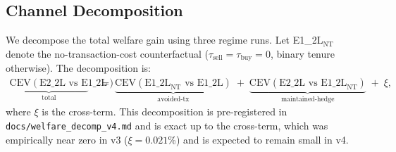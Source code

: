 \subsection{Channel Decomposition}
\label{sec:results:decomp}

We decompose the total welfare gain using three regime runs.
Let E1\_2L$_{\text{NT}}$ denote the no-transaction-cost counterfactual
($\tau_{\text{sell}} = \tau_{\text{buy}} = 0$, binary tenure otherwise).
The decomposition is:
\begin{align}
    \underbrace{\text{CEV}(\text{E2\_2L vs E1\_2L})}_{\text{total}}
    &\;=\;
    \underbrace{\text{CEV}(\text{E1\_2L}_{\text{NT}} \text{ vs E1\_2L})}_{\text{avoided-tx}}
    \;+\;
    \underbrace{\text{CEV}(\text{E2\_2L vs E1\_2L}_{\text{NT}})}_{\text{maintained-hedge}}
    \;+\; \xi,
    \label{eq:decomp}
\end{align}
where $\xi$ is the cross-term.
This decomposition is pre-registered in \texttt{docs/welfare\_decomp\_v4.md}
and is exact up to the cross-term, which was empirically near zero in v3
($\xi = 0.021$\%) and is expected to remain small in v4.

